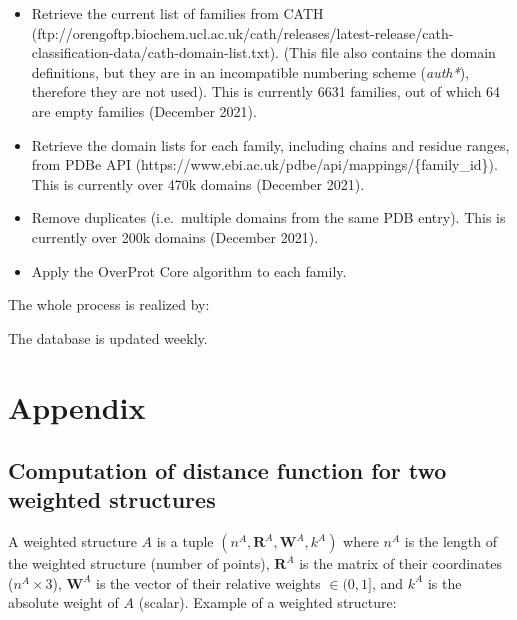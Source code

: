 \documentclass[12pt,draft]{article}
\newenvironment{Shaded}{}{}
\newcommand{\ExtensionTok}[1]{#1}
\newcommand{\NormalTok}[1]{#1}
\newcommand{\VariableTok}[1]{\textcolor[rgb]{0.10,0.09,0.49}{#1}}
\providecommand{\tightlist}{%
  \setlength{\itemsep}{0pt}\setlength{\parskip}{0pt}}
\begin{document}
\begin{itemize}
\tightlist
\item
  Retrieve the current list of families from CATH
  (ftp://orengoftp.biochem.ucl.ac.uk\allowbreak/cath/releases/latest-release/cath-classification-data/cath-domain-list.txt).
  (This file also contains the domain definitions, but they are in an
  incompatible numbering scheme (\emph{auth*}), therefore they are not
  used). This is currently 6631 families, out of which 64 are empty
  families (December 2021).
\item
  Retrieve the domain lists for each family, including chains and
  residue ranges, from PDBe API
  (https://www.ebi.ac.uk/pdbe/api/mappings/\{family\_id\}). This is
  currently over 470k domains (December 2021).
\item
  Remove duplicates (i.e.~multiple domains from the same PDB entry).
  This is currently over 200k domains (December 2021).
\item
  Apply the OverProt Core algorithm to each family.
\end{itemize}

The whole process is realized by:

\begin{Shaded}
\end{Shaded}

The database is updated weekly.

\hypertarget{appendix}{%
\section{Appendix}\label{appendix}}

\hypertarget{computation-of-distance-function-for-two-weighted-structures}{%
\subsection{Computation of distance function for two weighted
structures}\label{computation-of-distance-function-for-two-weighted-structures}}

A weighted structure \(A\) is a tuple
\((n^A, \mathbf{R}^A, \mathbf{W}^A, k^A)\) where \(n^A\) is the length
of the weighted structure (number of points), \(\mathbf{R}^A\) is the
matrix of their coordinates (\(n^A \times 3\)), \(\mathbf{W}^A\) is the
vector of their relative weights \(\in (0,1]\), and \(k^A\) is the
absolute weight of \(A\) (scalar). Example of a weighted structure:
\end{document}
